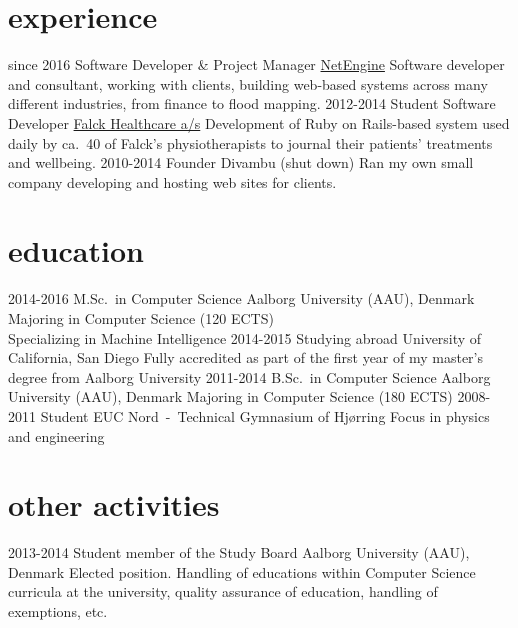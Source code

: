 \documentclass{afriggeri-cv/friggeri-cv}
\newcommand{\aau}{%
  Aalborg University (AAU), Denmark
}
\begin{document}
\section{experience}
\begin{entrylist}
  \entry%
    {since 2016}
    {Software Developer \& Project Manager}
    {\href{http://netengine.com.au/}{NetEngine}}
    {Software developer and consultant, working with clients, building web-based systems across many
    different industries, from finance to flood mapping.}
  \entry%
    {2012-2014}
    {Student Software Developer}
    {\href{http://www.falck.com/en/company/organisation/business-areas/healthcare}{Falck Healthcare a/s}}
    {Development of Ruby on Rails-based system used daily by ca.\ 40 of Falck's physiotherapists to journal their patients' treatments and wellbeing.}
  \entry
    {2010-2014}
    {Founder}
    {Divambu (shut down)}
    {Ran my own small company developing and hosting web sites for clients.}
\end{entrylist}

\section{education}

\begin{entrylist}
  \entry
    {2014-2016}
    {M.Sc.\ {\normalfont in Computer Science}}
    {\aau}
    {Majoring in Computer Science (120 ECTS)\\
    Specializing in Machine Intelligence}
  \entry
    {2014-2015}
    {Studying abroad}
    {University of California, San Diego}
    {Fully accredited as part of the first year of my master's degree from Aalborg University}
  \entry
    {2011-2014}
    {B.Sc.\ {\normalfont in Computer Science}}
    {\aau}
    {Majoring in Computer Science (180 ECTS)}
  \entry
    {2008-2011}
    {Student}
    {EUC Nord~-~Technical Gymnasium of Hjørring}
    {Focus in physics and engineering}
\end{entrylist}

\section{other activities}
\begin{entrylist}
  \entry
    {2013-2014}
    {Student member of the Study Board}
    {\aau}
    {Elected position. Handling of educations within Computer Science curricula at the university, quality assurance of education, handling of exemptions, etc.}
\end{entrylist}
\end{document}
